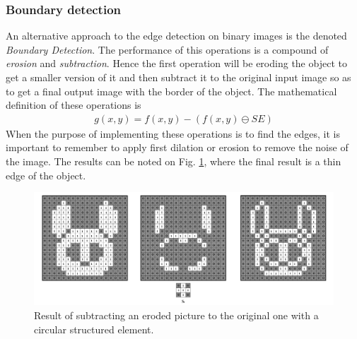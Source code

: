 \subsubsection{Boundary detection}
An alternative approach to the edge detection on binary images is the denoted \textit{Boundary Detection}. The performance of this operations is a compound of \textit{erosion} and \textit{subtraction}. Hence the first operation will be eroding the object to get a smaller version of it and then subtract it to the original input image so as to get a final output image with the border of the object. The mathematical definition of these operations is
\begin{equation}
\begin{aligned}
{g(x,y)}={f(x,y)}-({f(x,y)}\ominus{SE})
\label{BoundDetec}
	\end{aligned}
\end{equation}
When the purpose of implementing these operations is to find the edges, it is important to remember to apply first dilation or erosion to remove the noise of the image. The results can be noted on Fig. \ref{fig:Boundary}, where the final result is a thin edge of the object.

\begin{figure}[htbp]
\centering
\includegraphics[width=1\textwidth]{Pictures/Theory/BoundaryEdges_circ.png}
\caption{Result of subtracting an eroded picture to the original one with a circular structured element.}
\label{fig:Boundary}
\end{figure}

